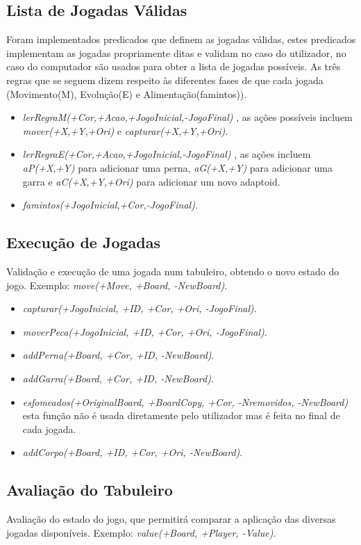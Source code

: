 \documentclass[a4paper]{article}
\begin{document}
\subsection{Lista de Jogadas Válidas}Foram implementados predicados que definem as jogadas válidas, estes predicados implementam as jogadas propriamente ditas e validam no caso do utilizador, no caso do computador são usados para obter a lista de jogadas possíveis. As três regras que se seguem dizem respeito às diferentes fases de que cada jogada (Movimento(M), Evolução(E) e Alimentação(famintos)).
\begin{itemize}
    \item \textit{lerRegraM(+Cor,+Acao,+JogoInicial,-JogoFinal)} , as ações possíveis incluem \textit{mover(+X,+Y,+Ori)} e \textit{capturar(+X,+Y,+Ori)}.
    \item \textit{lerRegraE(+Cor,+Acao,+JogoInicial,-JogoFinal)} , as ações incluem \textit{aP(+X,+Y)} para adicionar uma perna, \textit{aG(+X,+Y)} para adicionar uma garra e \textit{aC(+X,+Y,+Ori)} para adicionar um novo adaptoid.
    \item \textit{famintos(+JogoInicial,+Cor,-JogoFinal)}.
\end{itemize}

\subsection{Execução de Jogadas} Validação e execução de uma jogada num tabuleiro, obtendo o novo estado do jogo. Exemplo: \textit{move(+Move, +Board, -NewBoard)}.
\begin{itemize}
    \item \textit{capturar(+JogoInicial, +ID, +Cor, +Ori, -JogoFinal)}.
    \item \textit{moverPeca(+JogoInicial, +ID, +Cor, +Ori, -JogoFinal)}.
    \item \textit{addPerna(+Board, +Cor, +ID, -NewBoard)}.
    \item \textit{addGarra(+Board, +Cor, +ID, -NewBoard)}.
    \item \textit{esfomeados(+OriginalBoard, +BoardCopy, +Cor, -Nremovidos, -NewBoard)} esta função não é usada diretamente pelo utilizador mas é feita no final de cada jogada.
    \item \textit{addCorpo(+Board, +ID, +Cor, +Ori, -NewBoard)}.
\end{itemize}

\subsection{Avaliação do Tabuleiro} Avaliação do estado do jogo, que permitirá comparar a aplicação das diversas jogadas disponíveis. Exemplo: \textit{value(+Board, +Player, -Value)}.
\end{document}
